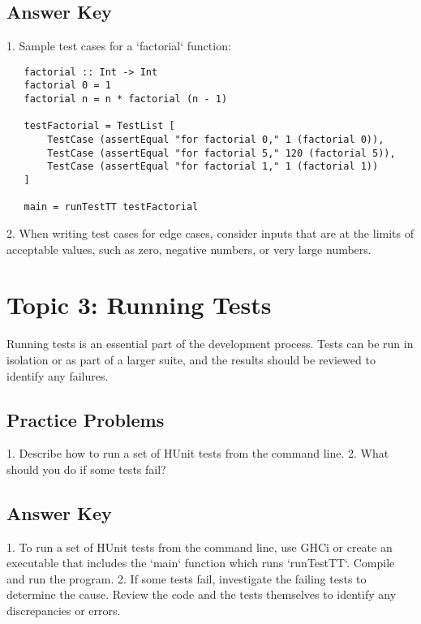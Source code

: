 \documentclass{article}
\begin{document}
\subsection*{Answer Key}
1. Sample test cases for a `factorial` function:
   \begin{verbatim}
   factorial :: Int -> Int
   factorial 0 = 1
   factorial n = n * factorial (n - 1)

   testFactorial = TestList [
       TestCase (assertEqual "for factorial 0," 1 (factorial 0)),
       TestCase (assertEqual "for factorial 5," 120 (factorial 5)),
       TestCase (assertEqual "for factorial 1," 1 (factorial 1))
   ]

   main = runTestTT testFactorial
   \end{verbatim}
2. When writing test cases for edge cases, consider inputs that are at the limits of acceptable values, such as zero, negative numbers, or very large numbers.

\section*{Topic 3: Running Tests}
Running tests is an essential part of the development process. Tests can be run in isolation or as part of a larger suite, and the results should be reviewed to identify any failures.

\subsection*{Practice Problems}
1. Describe how to run a set of HUnit tests from the command line.
2. What should you do if some tests fail?

\subsection*{Answer Key}
1. To run a set of HUnit tests from the command line, use GHCi or create an executable that includes the `main` function which runs `runTestTT`. Compile and run the program.
2. If some tests fail, investigate the failing tests to determine the cause. Review the code and the tests themselves to identify any discrepancies or errors.
\end{document}
